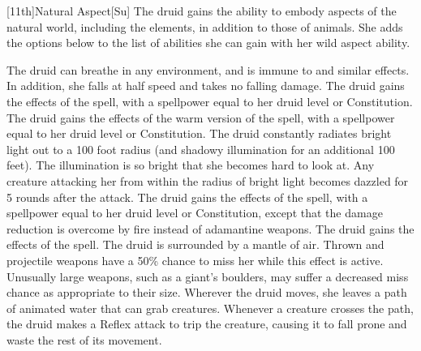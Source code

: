 [11th]{Natural Aspect}[Su]
The druid gains the ability to embody aspects of the natural world, including the elements, in addition to those of animals.
She adds the options below to the list of abilities she can gain with her wild aspect ability.


 The druid can breathe in any environment, and is immune to 
and similar effects.
In addition, she falls at half speed and takes no falling damage.
 The druid gains the effects of the 
spell, with a spellpower equal to her druid level or Constitution.
 The druid gains the effects of the warm version of the 
spell, with a spellpower equal to her druid level or Constitution.
The druid constantly radiates bright light out to a 100 foot radius (and shadowy illumination for an additional 100 feet).
The illumination is so bright that she becomes hard to look at.
Any creature attacking her from within the radius of bright light becomes dazzled for 5 rounds after the attack.
 The druid gains the effects of the 
spell, with a spellpower equal to her druid level or Constitution, except that the damage reduction is overcome by fire instead of adamantine weapons.
 The druid gains the effects of the 
spell.
 The druid is surrounded by a mantle of air.
Thrown and projectile weapons have a 50\% chance to miss her while this effect is active.
Unusually large weapons, such as a giant's boulders, may suffer a decreased miss chance as appropriate to their size.
 Wherever the druid moves, she leaves a path of animated water that can grab creatures.
Whenever a creature crosses the path, the druid makes a Reflex attack to trip the creature, causing it to fall prone and waste the rest of its movement.
